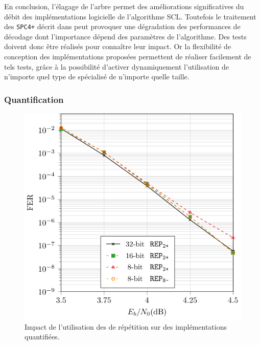 En conclusion, l'élagage de l'arbre permet des améliorations significatives du débit des implémentations logicielle de l'algorithme SCL. Toutefois le traitement des \noeuds \texttt{SPC4+} décrit dans \cite{sarkis_fast_2016} peut provoquer une dégradation des performances de décodage dont l'importance dépend des paramètres de l'algorithme. Des tests doivent donc être réalisés pour connaître leur impact. Or la flexibilité de conception des implémentations proposées permettent de réaliser facilement de tels tests, grâce à la possibilité d'activer dynamiquement l'utilisation de n'importe quel type de \noeud spécialisé de n'importe quelle taille.

\subsubsection{Quantification}

\begin{figure}
\centering
\includegraphics{main/ch2_fig/curves/bfer/tikz/bfer_rep}
\caption{Impact de l'utilisation des \noeuds de répétition sur des implémentations quantifiées.}
\label{fig:bfer_rep}
\end{figure}

